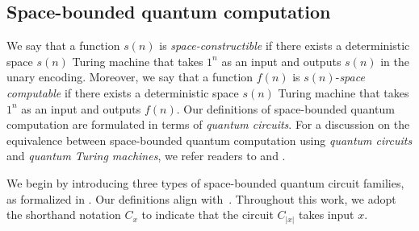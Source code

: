 \documentclass[11pt, a4paper]{article}
\numberwithin{equation}{section}
\numberwithin{figure}{section}
\begin{document}
\subsection{Space-bounded quantum computation}

We say that a function $s(n)$ is \textit{space-constructible} if there exists a deterministic space $s(n)$ Turing machine that takes $1^n$ as an input and outputs $s(n)$ in the unary encoding. 
Moreover, we say that a function $f(n)$ is $s(n)$-\textit{space computable} if there exists a deterministic space $s(n)$ Turing machine that takes $1^n$ as an input and outputs $f(n)$. 
Our definitions of space-bounded quantum computation are formulated in terms of \textit{quantum circuits}. For a discussion on the equivalence between space-bounded quantum computation using \textit{quantum circuits} and \textit{quantum Turing machines}, we refer readers to \cite[Appendix A]{FL18} and \cite[Section 2.2]{FR21}. 

We begin by introducing three types of space-bounded quantum circuit families, as formalized in . Our definitions align with~\cite[Section 2.3]{VW16}. Throughout this work, we adopt the shorthand notation $C_x$ to indicate that the circuit $C_{|x|}$ takes input $x$.
\end{document}
